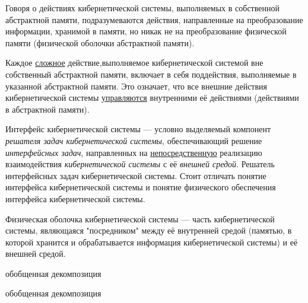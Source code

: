 Говоря о действиях кибернетической системы, выполняемых в собственной абстрактной памяти, подразумеваются действия, направленные на преобразование информации, хранимой в памяти, но никак не на преобразование физической памяти (физической оболочки абстрактной памяти).

Каждое \uline{сложное} действие,выполняемое кибернетической системой вне собственный абстрактной памяти, включает в себя поддействия, выполняемые в указанной абстрактной памяти. 
Это означает, что все внешние действия кибернетической системы \uline{управляются} внутренними её действиями (действиями в абстрактной памяти).


Интерфейс кибернетической системы --- условно выделяемый компонент \textit{решателя задач кибернетической системы}, обеспечивающий решение \textit{интерфейсных задач}, направленных на \uline{непосредственную} реализацию взаимодействия \textit{кибернетической системы} с её \textit{внешней средой}. Решатель интерфейсных задач кибернетической системы. Стоит отличать понятие интерфейса кибернетической системы и понятие физического обеспечения интерфейса кибернетической системы.

Физическая оболочка кибернетической системы --- часть кибернетической системы, являющаяся "посредником"{} между её внутренней средой (памятью, в которой хранится и обрабатывается информация кибернетической системы) и её внешней средой.

\begin{SCn}
	\begin{scnrelfromset}{обобщенная декомпозиция}
	\end{scnrelfromset}
\end{SCn}


\begin{SCn}
	\begin{scnrelfromset}{обобщенная декомпозиция}
	\end{scnrelfromset}
\end{SCn}

